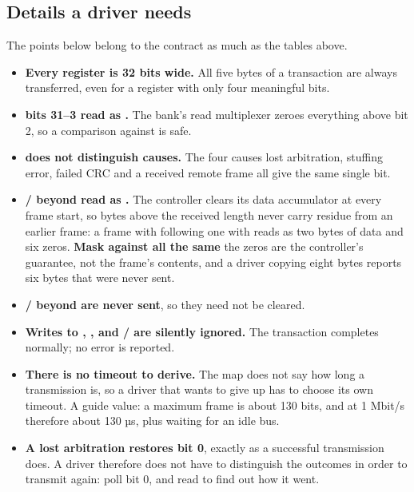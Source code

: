 \subsection{Details a driver needs}
\label{app:protocol:driver}

The points below belong to the contract as much as the tables above.

\begin{itemize}
  \item \textbf{Every register is 32 bits wide.} All five bytes of a transaction are always
    transferred, even for a register with only four meaningful bits.
  \item \textbf{ bits 31--3 read as .} The bank's read multiplexer zeroes
    everything above bit 2, so a comparison against  is safe.
  \item \textbf{ does not distinguish causes.} The four causes \textemdash{} lost
    arbitration, stuffing error, failed CRC and a received remote frame \textemdash{} all give the
    same single bit.
  \item \textbf{/ beyond  read as .} The controller
    clears its data accumulator at every frame start, so bytes above the received length never carry
    residue from an earlier frame: a frame with  following one with  reads
    as two bytes of data and six zeros. \textbf{Mask against  all the same}
    \textemdash{} the zeros are the controller's guarantee, not the frame's contents, and a driver
    copying eight bytes reports six bytes that were never sent.
  \item \textbf{/ beyond  are never sent}, so they need not be
    cleared.
  \item \textbf{Writes to , ,  and
    / are silently ignored.} The transaction completes normally; no error is
    reported.
  \item \textbf{There is no timeout to derive.} The map does not say how long a transmission is, so a
    driver that wants to give up has to choose its own timeout. A guide value: a maximum frame is
    about 130 bits, and at 1 Mbit/s therefore about 130 µs, plus waiting for an idle bus.
  \item \textbf{A lost arbitration restores  bit 0}, exactly as a successful
    transmission does. A driver therefore does not have to distinguish the outcomes in order to
    transmit again: poll bit 0, and read  to find out how it went.
\end{itemize}

